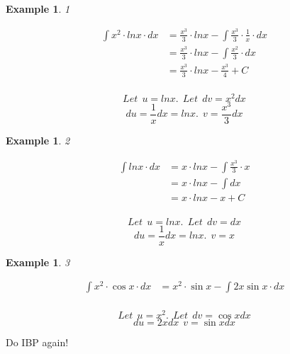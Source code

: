 \documentclass{letter}
\newtheorem{example}[theorem]{Example}
\begin{document}
\begin{example}
1 \\
\begin{minipage}{.5\textwidth} %

\begin{align*}
\int x^2\cdot lnx \cdot dx & = \frac{x^3}{3} \cdot lnx - \int \frac{x^3}{3} \cdot \frac{1}{x} \cdot dx  \\
&=  \frac{x^3}{3} \cdot lnx - \int \frac{x^2}{3} \cdot dx  \\
&= \frac{x^3}{3} \cdot lnx - \frac{x^3}{4} + C\\  
\end{align*}

\end{minipage} %
\begin{minipage}{.5\textwidth} %
$$ Let \ \ u = ln x. \     \ Let \ \ dv = x^2dx $$
$$ du = \frac{1}{x} dx = ln x. \     \ v =\frac{x^3}{3} dx $$
\end{minipage}

\end{example}


\begin{example}
2 \\
\begin{minipage}{.5\textwidth} %

\begin{align*}
\int lnx \cdot dx & = x \cdot lnx - \int \frac{x^3}{3} \cdot x \\
&= x \cdot lnx  - \int dx  \\
&= x \cdot lnx - x + C\\  
\end{align*}

\end{minipage} %
\begin{minipage}{.5\textwidth} %
$$ Let \ \ u = ln x. \     \ Let \ \ dv = dx $$
$$ du = \frac{1}{x} dx = ln x. \     \ v = x  $$

\end{minipage}
\newpage
\end{example}
\begin{example}
3 \\
\begin{minipage}{.5\textwidth} %

\begin{align*}
\int x^2\cdot \cos{x} \cdot dx & = x^2\cdot \sin {x} - \int 2x \sin {x} \cdot dx  \\  
\end{align*}

\end{minipage} %
\begin{minipage}{.5\textwidth} %
$$ Let \ \ u = x^2. \     \ Let \ \ dv = \cos{x}dx $$
$$ du = 2xdx \     \ v = \sin x dx $$
\end{minipage}

\end{example}
\begin{center}
\Large{Do IBP again!}
\end{center}
\end{document}
